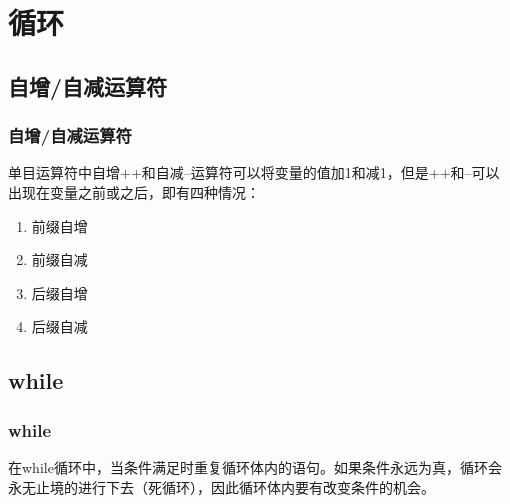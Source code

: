 \chapter{循环}

\section{自增/自减运算符}

\subsection{自增/自减运算符}

单目运算符中自增++和自减--运算符可以将变量的值加1和减1，但是++和--可以出现在变量之前或之后，即有四种情况：

\begin{enumerate}
	\item 前缀自增
	\item 前缀自减
	\item 后缀自增
	\item 后缀自减
\end{enumerate}

\begin{table}[H]
	\centering
	\caption{自增/自减运算符}
\end{table}

\newpage

\section{while}

\subsection{while}

在while循环中，当条件满足时重复循环体内的语句。如果条件永远为真，循环会永无止境的进行下去（死循环），因此循环体内要有改变条件的机会。 \\

